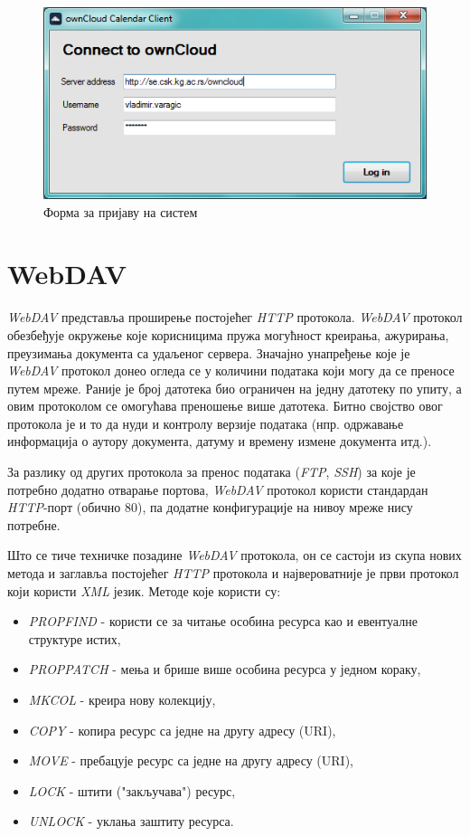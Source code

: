 \begin{figure}[H]
	\centering
	\includegraphics[scale=0.5]{slike/logInForm.png}
	\caption{Форма за пријаву на систем}
	\label{fig:xwt_login_form}
\end{figure}

\section {WebDAV}

\textit{WebDAV} представља проширење постојећег \textit{HTTP} протокола. \textit{WebDAV} протокол обезбеђује окружење које корисницима пружа могућност креирања, ажурирања, преузимања документа са удаљеног сервера. Значајно унапређење које је \textit{WebDAV} протокол донео огледа се у количини података који могу да се преносе путем мреже. Раније је број датотека био ограничен на једну датотеку по упиту, а овим протоколом се омогућава преношење више датотека. Битно својство овог протокола је и то да нуди и контролу верзије података (нпр. одржавање информација о аутору документа, датуму и времену измене документа итд.).

За разлику од других протокола за пренос података (\textit{FTP}, \textit{SSH}) за које је потребно додатно отварање портова, \textit{WebDAV} протокол користи стандардан \textit{HTTP}-порт (обично 80), па додатне конфигурације на нивоу мреже нису потребне.

Што се тиче техничке позадине \textit{WebDAV} протокола, он се састоји из скупа нових метода и заглавља постојећег \textit{HTTP} протокола и највероватније је први протокол који користи \textit{XML} језик. Методе које користи су:
\begin{itemize}
	\item {\textit{PROPFIND} -  користи се за читање особина ресурса као и евентуалне структуре истих},
	\item {\textit{PROPPATCH} - мења и брише више особина ресурса у једном кораку},
	\item {\textit{MKCOL} - креира нову колекцију},
	\item {\textit{COPY} - копира ресурс са једне на другу адресу (URI)},
	\item {\textit{MOVE} - пребацује ресурс са једне на другу адресу (URI)},
	\item {\textit{LOCK} - штити ("закључава") ресурс},
	\item {\textit{UNLOCK} - уклања заштиту ресурса}.
\end{itemize}

